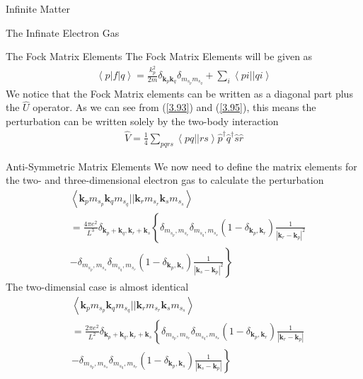 \documentclass[twoside,english]{uiofysmaster}
\begin{document}
\begin{chapter}{Infinite Matter}
\begin{section}{The Infinate Electron Gas}
		\begin{subsection}{The Fock Matrix Elements}
			The Fock Matrix Elements will be given as
			\begin{align}
				\left< p | f | q \right> = \frac{k_p^2}{2m} \delta_{\mathbf{k}_p \mathbf{k}_q} \delta_{m_{s_p} m_{s_q}} + \sum_i \left<pi||qi\right>
			\end{align}
			We notice that the Fock Matrix elements can be written as a diagonal part plus the $\hat U$ operator. As we can see from (\ref{3.93}) and (\ref{3.95}), this means the perturbation can be written solely by the two-body interaction
			\begin{align}
				\hat V = \frac{1}{4} \sum_{pqrs} \left<pq||rs\right> \hat p^\dagger \hat q^\dagger \hat s \hat r
			\end{align}
		\end{subsection}

		\begin{subsection}{Anti-Symmetric Matrix Elements}
			We now need to define the matrix elements for the two- and three-dimensional electron gas to calculate the perturbation 
			\begin{align}
				&\left< \mathbf{k}_p m_{s_p} \mathbf{k}_q m_{s_q} || \mathbf{k}_r m_{s_r} \mathbf{k}_s m_{s_s} \right> \\
				&= \frac{4 \pi e^2}{L^3} \delta_{\mathbf{k}_p + \mathbf{k}_q, \mathbf{k}_r + \mathbf{k}_s} \left\{ \delta_{ m_{s_p},m_{s_r} } \delta_{ m_{s_q},m_{s_s} } (1 - \delta_{\mathbf{k}_p, \mathbf{k}_r}) \frac{1}{| \mathbf{k}_r - \mathbf{k}_p|^2} \right. \\
				& - \delta_{ m_{s_p},m_{s_s} } \delta_{ m_{s_q},m_{s_r} } (1 - \delta_{\mathbf{k}_p, \mathbf{k}_s}) \left. \frac{1}{| \mathbf{k}_s - \mathbf{k}_p|^2}  \right\}
			\end{align}
			The two-dimensial case is almost identical
			\begin{align}
				&\left< \mathbf{k}_p m_{s_p} \mathbf{k}_q m_{s_q} || \mathbf{k}_r m_{s_r} \mathbf{k}_s m_{s_s} \right> \\
				&= \frac{2 \pi e^2}{L^2} \delta_{\mathbf{k}_p + \mathbf{k}_q, \mathbf{k}_r + \mathbf{k}_s} \left\{ \delta_{ m_{s_p},m_{s_r} } \delta_{ m_{s_q},m_{s_s} } (1 - \delta_{\mathbf{k}_p, \mathbf{k}_r}) \frac{1}{| \mathbf{k}_r - \mathbf{k}_p|} \right. \\
				& - \delta_{ m_{s_p},m_{s_s} } \delta_{ m_{s_q},m_{s_r} } (1 - \delta_{\mathbf{k}_p, \mathbf{k}_s}) \left. \frac{1}{| \mathbf{k}_s - \mathbf{k}_p|}  \right\}
			\end{align}		
		\end{subsection}


\end{section}
\end{chapter}
\end{document}
